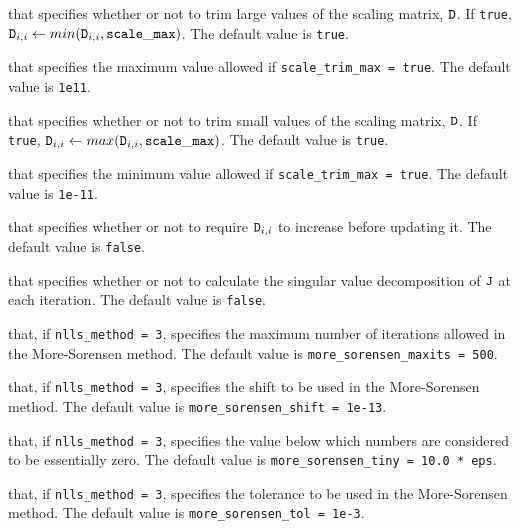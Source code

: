 \begin{description}
that specifies whether or not to trim large values of the scaling matrix, ${\tt D}$.
If {\tt true}, ${\tt D}_{i,i} \leftarrow min({\tt D}_{i,i}, {\tt scale\_max})$.
The default value is {\tt true}.

that specifies the maximum value allowed if {\tt scale\_trim\_max = true}.
The default value is {\tt 1e11}.

that specifies whether or not to trim small values of the scaling matrix, ${\tt D}$.
If {\tt true}, ${\tt D}_{i,i} \leftarrow max({\tt D}_{i,i}, {\tt scale\_max})$.
The default value is {\tt true}.

that specifies the minimum value allowed if {\tt scale\_trim\_max = true}.
The default value is {\tt 1e-11}.

that specifies whether or not to require ${\tt D}_{i,i}$ to increase before updating it.
The default value is {\tt false}.

that specifies whether or not to calculate the singular value decomposition of ${\tt J}$
at each iteration.
The default value is {\tt false}.



that, if {\tt nlls\_method = 3}, specifies the maximum number of iterations allowed in the More-Sorensen method.
The default value is {\tt more\_sorensen\_maxits = 500}.

that, if {\tt nlls\_method = 3}, specifies the shift to be used in the More-Sorensen method.
The default value is {\tt more\_sorensen\_shift = 1e-13}.

that, if {\tt nlls\_method = 3}, specifies the value below which numbers are considered to be essentially zero.
The default value is {\tt more\_sorensen\_tiny = 10.0 * eps}.

that, if {\tt nlls\_method = 3}, specifies the tolerance to be used in the More-Sorensen method.
The default value is {\tt more\_sorensen\_tol = 1e-3}.


\end{description}

